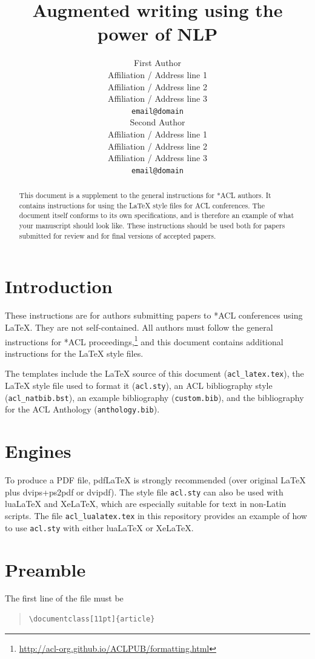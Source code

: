 \documentclass[11pt]{article}
\title{Augmented writing using the power of NLP}
\author{First Author \\
  Affiliation / Address line 1 \\
  Affiliation / Address line 2 \\
  Affiliation / Address line 3 \\
  \texttt{email@domain} \\\And
  Second Author \\
  Affiliation / Address line 1 \\
  Affiliation / Address line 2 \\
  Affiliation / Address line 3 \\
  \texttt{email@domain} \\}
\begin{document}
\maketitle
\begin{abstract}
This document is a supplement to the general instructions for *ACL authors. It contains instructions for using the \LaTeX{} style files for ACL conferences.
The document itself conforms to its own specifications, and is therefore an example of what your manuscript should look like.
These instructions should be used both for papers submitted for review and for final versions of accepted papers.
\end{abstract}

\section{Introduction}

These instructions are for authors submitting papers to *ACL conferences using \LaTeX. They are not self-contained. All authors must follow the general instructions for *ACL proceedings,\footnote{\url{http://acl-org.github.io/ACLPUB/formatting.html}} and this document contains additional instructions for the \LaTeX{} style files.

The templates include the \LaTeX{} source of this document (\texttt{acl\_latex.tex}),
the \LaTeX{} style file used to format it (\texttt{acl.sty}),
an ACL bibliography style (\texttt{acl\_natbib.bst}),
an example bibliography (\texttt{custom.bib}),
and the bibliography for the ACL Anthology (\texttt{anthology.bib}).

\section{Engines}

To produce a PDF file, pdf\LaTeX{} is strongly recommended (over original \LaTeX{} plus dvips+ps2pdf or dvipdf).
The style file \texttt{acl.sty} can also be used with
lua\LaTeX{} and
Xe\LaTeX{}, which are especially suitable for text in non-Latin scripts.
The file \texttt{acl\_lualatex.tex} in this repository provides
an example of how to use \texttt{acl.sty} with either
lua\LaTeX{} or
Xe\LaTeX{}.

\section{Preamble}

The first line of the file must be
\begin{quote}
\begin{verbatim}
\documentclass[11pt]{article}
\end{verbatim}
\end{quote}
\end{document}
